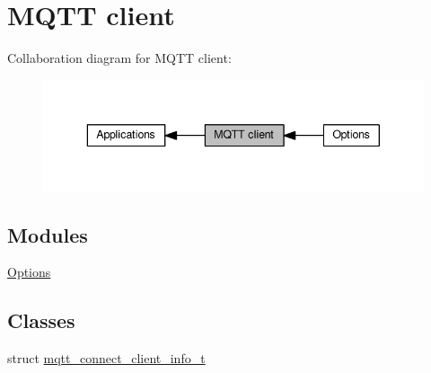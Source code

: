 \hypertarget{group__mqtt}{}\section{M\+Q\+TT client}
\label{group__mqtt}
Collaboration diagram for M\+Q\+TT client\+:
\nopagebreak
\begin{figure}[H]
\begin{center}
\leavevmode
\includegraphics[width=343pt]{group__mqtt}
\end{center}
\end{figure}
\subsection*{Modules}
\begin{DoxyCompactItemize}
\item 
\hyperlink{group__mqtt__opts}{Options}
\end{DoxyCompactItemize}
\subsection*{Classes}
\begin{DoxyCompactItemize}
\item 
struct \hyperlink{structmqtt__connect__client__info__t}{mqtt\+\_\+connect\+\_\+client\+\_\+info\+\_\+t}
\end{DoxyCompactItemize}
